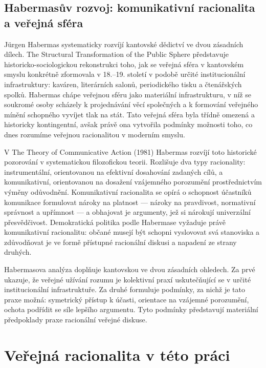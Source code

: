\subsection{Habermasův rozvoj: komunikativní racionalita a veřejná sféra}

Jürgen Habermas systematicky rozvíjí kantovské dědictví ve dvou zásadních dílech. The Structural Transformation of the Public Sphere \parencite{Habermas89} představuje historicko-sociologickou rekonstrukci toho, jak se veřejná sféra v kantovském smyslu konkrétně zformovala v 18.–19. století v podobě určité institucionální infrastruktury: kaváren, literárních salonů, periodického tisku a čtenářských spolků. Habermas chápe veřejnou sféru jako materiální infrastrukturu, v níž se soukromé osoby scházely k projednávání věcí společných a k formování veřejného mínění schopného vyvíjet tlak na stát. Tato veřejná sféra byla třídně omezená a historicky kontingentní, avšak právě ona vytvořila podmínky možnosti toho, co dnes rozumíme veřejnou racionalitou v moderním smyslu.

V The Theory of Communicative Action (1981) \parencite{Habermas84} Habermas rozvíjí toto historické pozorování v systematickou filozofickou teorii. Rozlišuje dva typy racionality: instrumentální, orientovanou na efektivní dosahování zadaných cílů, a komunikativní, orientovanou na dosažení vzájemného porozumění prostřednictvím výměny odůvodnění. Komunikativní racionalita se opírá o schopnost účastníků komunikace formulovat nároky na platnost — nároky na pravdivost, normativní správnost a upřímnost — a obhajovat je argumenty, jež si nárokují univerzální přesvědčivost. Demokratická politika podle Habermase vyžaduje právě komunikativní racionalitu: občané musejí být schopni vyslovovat svá stanoviska a zdůvodňovat je ve formě přístupné racionální diskusi a napadení ze strany druhých.

Habermasova analýza doplňuje kantovskou ve dvou zásadních ohledech. Za prvé ukazuje, že veřejné užívání rozumu je kolektivní praxí uskutečňující se v určité institucionální infrastruktuře. Za druhé formuluje podmínky, za nichž je tato praxe možná: symetrický přístup k účasti, orientace na vzájemné porozumění, ochota podřídit se síle lepšího argumentu. Tyto podmínky představují materiální předpoklady praxe racionální veřejné diskuse.

\section{Veřejná racionalita v této práci}

